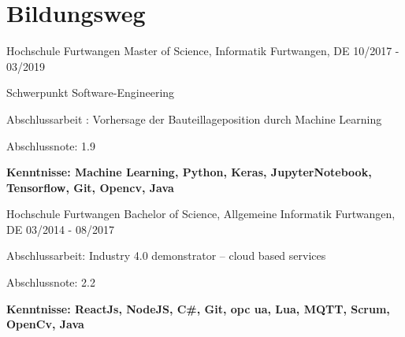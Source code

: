 
\section{Bildungsweg}
\cventry
{Hochschule Furtwangen} %
{Master of Science, Informatik} %
{Furtwangen, DE} %
{10/2017 - 03/2019} %
\begin{cvitems}
\item{ Schwerpunkt Software-Engineering}
\item {Abschlussarbeit : Vorhersage der Bauteillageposition durch Machine Learning}
\item {Abschlussnote: 1.9}
\item {\textbf{Kenntnisse: Machine Learning, Python, Keras, JupyterNotebook, Tensorflow, Git, Opencv, Java}}
\end{cvitems}

\cventry
{Hochschule Furtwangen} %
{Bachelor of Science, Allgemeine Informatik} %
{Furtwangen, DE} %
{03/2014 - 08/2017} %
\begin{cvitems}
\item {Abschlussarbeit: Industry 4.0 demonstrator – cloud based services}
\item {Abschlussnote: 2.2}
\item {\textbf{Kenntnisse: ReactJs, NodeJS, C\#, Git, opc ua, Lua, MQTT, Scrum, OpenCv, Java}}
\end{cvitems}
